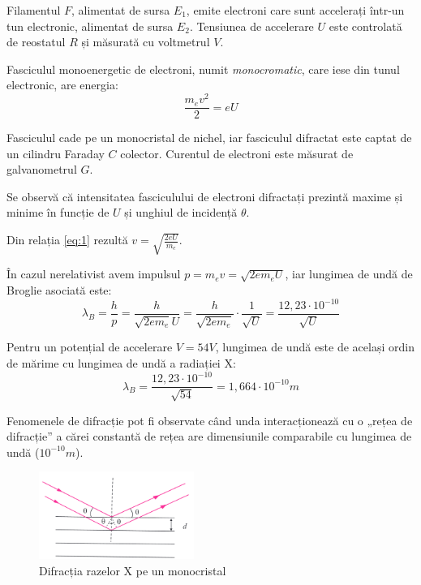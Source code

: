 Filamentul $F$, alimentat de sursa $E_1$, emite electroni care sunt accelerați
într-un tun electronic, alimentat de sursa $E_2$. Tensiunea de accelerare $U$
este controlată de reostatul $R$ și măsurată cu voltmetrul $V$.

Fasciculul monoenergetic de electroni, numit \emph{monocromatic}, care iese din
tunul electronic, are energia:
\begin{equation}
    \frac{m_e v^2}{2} = eU \label{eq:1}
\end{equation}

Fasciculul cade pe un monocristal de nichel, iar fasciculul difractat este
captat de un cilindru Faraday $C$ colector. Curentul de electroni este măsurat
de galvanometrul $G$.

Se observă că intensitatea fasciculului de electroni difractați prezintă maxime
și minime în funcție de $U$ și unghiul de incidență $\theta$.

Din relația \eqref{eq:1} rezultă \( v = \sqrt{\frac{2eU}{m_e}} \).

În cazul nerelativist avem impulsul \( p = m_e v = \sqrt{2em_e U} \), iar
lungimea de undă de Broglie asociată este:
\[
    \lambda_B = \frac{h}{p} = \frac{h}{\sqrt{2em_e} U}
    = \frac{h}{\sqrt{2em_e}} \cdot \frac{1}{\sqrt{U}}
    = \frac{12,23 \cdot 10^{-10}}{\sqrt{U}}
\]

Pentru un potențial de accelerare \( V = 54 \unit{V} \), lungimea de undă
este de același ordin de mărime cu lungimea de undă a radiației X:
\begin{equation}
    \lambda_B = \frac{12,23 \cdot 10^{-10}}{\sqrt{54}}
    = 1,664 \cdot 10^{-10} \unit{m} \label{eq:2}
\end{equation}

Fenomenele de difracție pot fi observate când unda interacționează cu o „rețea
de difracție” a cărei constantă de rețea are dimensiunile comparabile cu
lungimea de undă (\( 10^{-10} \unit{m} \)).

\begin{figure}
    \includegraphics[width=0.45\textwidth]{fig/monocristal}
    \caption{Difracția razelor X pe un monocristal}
\end{figure}

